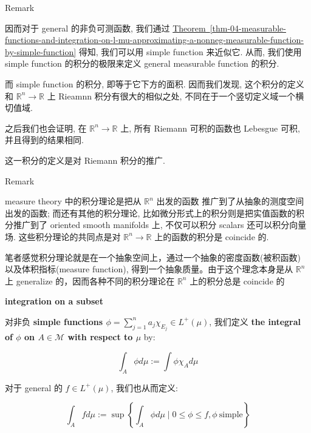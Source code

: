 \documentclass{qlnotes-export}
\begin{document}
\begin{qlremark}{Remark}

因而对于 general 的非负可测函数, 我们通过 \hyperref[thm-04-measurable-functions-and-integration-on-l-mu-approximating-a-nonneg-measurable-function-by-simple-function]{Theorem~\ref*{thm-04-measurable-functions-and-integration-on-l-mu-approximating-a-nonneg-measurable-function-by-simple-function}} 得知, 我们可以用 simple function 来近似它. 从而, 我们使用 simple function 的积分的极限来定义 general measurable function 的积分.

而 simple function 的积分, 即等于它下方的面积. 因而我们发现, 这个积分的定义和 \({\mathbb{R}}^{n}\rightarrow{\mathbb{R}}\) 上 Rieamnn 积分有很大的相似之处, 不同在于一个竖切定义域一个横切值域.

之后我们也会证明, 在 \({\mathbb{R}}^{n}\rightarrow{\mathbb{R}}\) 上, 所有 Riemann 可积的函数也 Lebesgue 可积, 并且得到的结果相同.

这一积分的定义是对 Riemann 积分的推广.

\end{qlremark}

\begin{qlremark}{Remark}

measure theory 中的积分理论是把从 \({\mathbb{R}}^{n}\) 出发的函数 推广到了从抽象的测度空间出发的函数; 而还有其他的积分理论, 比如微分形式上的积分则是把实值函数的积分推广到了 oriented smooth manifolds 上, 不仅可以积分 scalars 还可以积分向量场. 这些积分理论的共同点是对 \({\mathbb{R}}^{n}\rightarrow{\mathbb{R}}\) 上的函数的积分是 coincide 的.

笔者感觉积分理论就是在一个抽象空间上，通过一个抽象的密度函数(被积函数) 以及体积指标(measure function), 得到一个抽象质量。由于这个理念本身是从 \({\mathbb{R}}^{n}\) 上 generalize 的，因而各种不同的积分理论在 \({\mathbb{R}}^{n}\) 上的积分总是 coincide 的

\end{qlremark}

\begin{definition}{\protect{}\label{kn-integration-on-a-subset}{\textbf{integration
on a subset}}}

对非负 \textbf{simple functions \(\phi = \sum_{j = 1}^{n}a_{j}\chi_{E_{j}} \in L^{+}(\mu)\)}, 我们定义 \textbf{the integral of \(\phi\) on \(A \in \mathcal{M}\) with respect to \(\mu\)} by:

\[\int_{A}\phi d\mu := \int\phi\chi_{A} d\mu\]

对于 general 的 \(f \in L^{+}(\mu)\), 我们也从而定义:

\[\int_{A}fd\mu := \sup\left\{ {\int_{A}\phi d\mu \mid 0 \leq \phi \leq f,\phi\ \text{simple}} \right\}\]

\end{definition}
\end{document}

